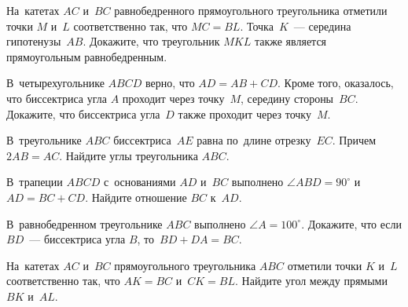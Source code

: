 


\begin{problems}

\item
На~катетах $AC$ и~$BC$ равнобедренного прямоугольного треугольника отметили
точки $M$ и~$L$ соответственно так, что $MC = BL$.
Точка~$K$~--- середина гипотенузы~$AB$.
Докажите, что треугольник $MKL$ также является прямоугольным равнобедренным.

\item
В~четырехугольнике $ABCD$ верно, что $AD = AB + CD$.
Кроме того, оказалось, что биссектриса угла $A$ проходит через точку~$M$,
середину стороны~$BC$.
Докажите, что биссектриса угла~$D$ также проходит через точку~$M$.

\item
В~треугольнике $ABC$ биссектриса~$AE$ равна по~длине отрезку~$EC$.
Причем $2 AB = AC$.
Найдите углы треугольника $ABC$.

\item
В~трапеции $ABCD$ с~основаниями $AD$ и~$BC$ выполнено $\angle ABD = 90^{\circ}$
и~$AD = BC + CD$.
Найдите отношение $BC$ к~$AD$.

\item
В~равнобедренном треугольнике $ABC$ выполнено $\angle A = 100^{\circ}$.
Докажите, что если $BD$~--- биссектриса угла $B$, то~$BD + DA = BC$.

\item
На~катетах $AC$ и~$BC$ прямоугольного треугольника $ABC$ отметили
точки $K$ и~$L$ соответственно так, что $AK = BC$ и~$CK = BL$.
Найдите угол между прямыми $BK$ и~$AL$.

\end{problems}

